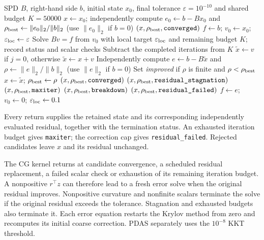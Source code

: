 \begin{algorithm}[htbp]
\caption{Guarded residual correction checks the initial state and every subsequent candidate against the original inactive equations.}
\label{alg:mesh_residual_correction}
\begin{algorithmic}[1]
\Require SPD $B$, right-hand side $b$, initial state $x_0$,
final tolerance $\varepsilon=10^{-10}$ and shared budget $K=50000$
\State $x\gets x_0$; independently compute $e_0\gets b-Bx_0$ and
$\rho_{\rm best}\gets\|e_0\|_2/\|b\|_2$ (use $\|e_0\|_2$ if $b=0$)
  \State \Return $(x,\rho_{\rm best},\texttt{converged})$
\EndIf
\State $f\gets b$; $v_0\gets x_0$; $\varepsilon_{\rm loc}\gets\varepsilon$
  \State Solve $Bv=f$ from $v_0$ with local target $\varepsilon_{\rm loc}$
  and remaining budget $K$; record status and scalar checks
  \State Subtract the completed iterations from $K$
  \State $\widetilde x\gets v$ if $j=0$, otherwise $\widetilde x\gets x+v$
  \State Independently compute $e\gets b-B\widetilde x$ and
  $\rho\gets\|e\|_2/\|b\|_2$ (use $\|e\|_2$ if $b=0$)
  \State Set \emph{improved} if $\rho$ is finite and $\rho<\rho_{\rm best}$
   \State $x\gets\widetilde x$; $\rho_{\rm best}\gets\rho$ \EndIf
  \If{$\rho\leq\varepsilon$} \State \Return $(x,\rho_{\rm best},\texttt{converged})$ \EndIf
   \State \Return $(x,\rho_{\rm best},\texttt{residual\_stagnation})$ \EndIf
   \State \Return $(x,\rho_{\rm best},\texttt{maxiter})$ \EndIf
    \State \Return $(x,\rho_{\rm best},\texttt{breakdown})$
  \EndIf
   \State \Return $(x,\rho_{\rm best},\texttt{residual\_failed})$ \EndIf
  \State $f\gets e$; $v_0\gets0$; $\varepsilon_{\rm loc}\gets0.1$
\EndFor
\end{algorithmic}
\end{algorithm}

Every return supplies the retained state and its corresponding independently
evaluated residual, together with the termination status.
An exhausted iteration budget gives \texttt{maxiter}; the correction cap
gives \texttt{residual\_failed}. Rejected candidates leave $x$ and its residual unchanged.

The CG kernel returns at candidate convergence, a scheduled residual
replacement, a failed scalar check or exhaustion of its remaining iteration budget.
A nonpositive $r^\top z$ can therefore lead to a fresh error solve
when the original residual improves. Nonpositive curvature and nonfinite
scalars terminate the solve if the original residual exceeds the tolerance. Stagnation and
exhausted budgets also terminate it. Each error equation restarts the
Krylov method from zero and recomputes its initial coarse correction.
PDAS separately uses the $10^{-8}$ KKT threshold.

